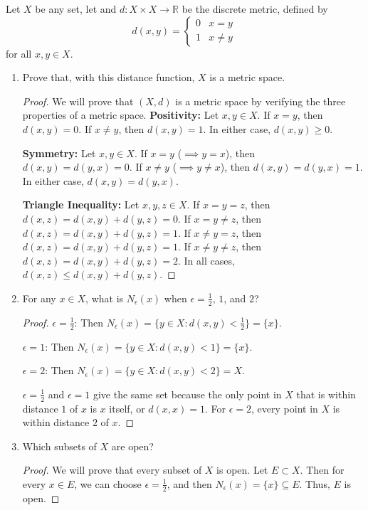 \documentclass[10pt]{article}
\newcommand{\R}{\mathbb{R}}
\newenvironment{problem}[2][Problem]{\begin{trivlist}
\item[\hskip \labelsep {\bfseries #1}\hskip \labelsep {\bfseries #2.}]}{\end{trivlist}}
\begin{document}
\begin{problem}{3}
	Let $X$ be any set, let and $d:X\times X\to \R$ be the discrete metric, defined by
	\[
	d(x,y)=\begin{cases}0&x=y \, \\ 1&x\neq y\end{cases}
	\]
	for all $x,y\in X$.
	\begin{enumerate}
		\item Prove that, with this distance function, $X$ is a metric space.
            \begin{proof}
                We will prove that $(X, d)$ is a metric space by verifying the three properties of a metric space.
                \textbf{Positivity:} Let $x, y \in X$. If $x = y$, then $d(x, y) = 0$. If $x \neq y$, then $d(x, y) = 1$. In either case, $d(x, y) \geq 0$.

                \textbf{Symmetry:} Let $x, y \in X$. If $x = y$ ($\implies y=x$), then $d(x, y) = d(y, x) = 0$. If $x \neq y$ ($\implies y\neq x$), then $d(x, y) = d(y, x) = 1$. In either case, $d(x, y) = d(y, x)$.

                \textbf{Triangle Inequality:} Let $x, y, z \in X$. If $x = y = z$, then $d(x, z) = d(x, y) + d(y, z) = 0$. If $x = y \neq z$, then $d(x, z) = d(x, y) + d(y, z) = 1$. If $x \neq y = z$, then $d(x, z) = d(x, y) + d(y, z) = 1$. If $x \neq y \neq z$, then $d(x, z) = d(x, y) + d(y, z) = 2$. In all cases, $d(x, z) \leq d(x, y) + d(y, z)$.
            \end{proof}
		\item For any $x\in X$, what is $N_\epsilon(x)$ when $\epsilon = \frac{1}{2}$, $1$, and $2$?
            \begin{proof}
\hfill

                \textbf{$\epsilon = \frac{1}{2}$}: Then $N_\epsilon(x) = \{y \in X : d(x, y) < \frac{1}{2}\} = \{x\}$.
                
                \textbf{$\epsilon = 1$}: Then $N_\epsilon(x) = \{y \in X : d(x, y) < 1\} = \{x\}$.

                \textbf{$\epsilon = 2$}: Then $N_\epsilon(x) = \{y \in X : d(x, y) < 2\} = X$.

                $\epsilon = \frac{1}{2}$ and $\epsilon = 1$ give the same set because the only point in $X$ that is within distance $1$ of $x$ is $x$ itself, or $d(x,x) = 1$. For $\epsilon = 2$, every point in $X$ is within distance $2$ of $x$.
            \end{proof}
		\item Which subsets of $X$ are open?
            \begin{proof}
                We will prove that every subset of $X$ is open. Let $E \subset X$. Then for every $x \in E$, we can choose $\epsilon = \frac{1}{2}$, and then $N_\epsilon(x) = \{x\} \subseteq E$. Thus, $E$ is open.
            \end{proof}
	\end{enumerate}
\end{problem}
\end{document}
